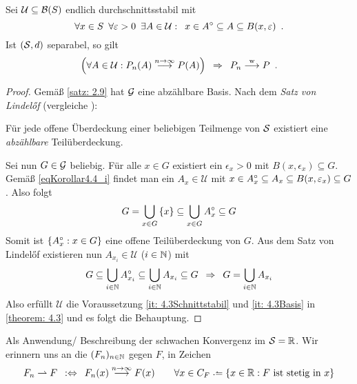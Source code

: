 \begin{korollar} \label{korollar4.4}
	Sei $\mathcal{U} \subseteq \B(S)$ endlich durchschnittsstabil mit
	\begin{equation} \label{eqKorollar4.4_i}
		\forall x\in S \enskip \forall \epsilon > 0 \enskip \exists A \in \mathcal{U} : \enskip x \in \inner A \subseteq A \subseteq B(x,\epsilon)
		\satzende
	\end{equation}
	Ist $(\S,d)$ separabel, so gilt
	\begin{align*}
		\brackets{\forall A \in \mathcal{U}: P_n(A) \ntoinf P(A)}
		\follows P_n \weakto P
		\satzende
	\end{align*}
\end{korollar}

\begin{proof}
	Gemäß \cref{satz: 2.9} hat $\G$ eine abzählbare Basis. Nach dem \textit{Satz von Lindelőf} (vergleiche \cite{schubert423277teubner}):
	\begin{center}
		Für jede offene Überdeckung einer beliebigen Teilmenge von $\S$ existiert eine \emph{abzählbare} Teilüberdeckung.
	\end{center}
	Sei nun $G\in\G$ beliebig.
	Für alle $x\in G$ existiert ein $\epsilon_x>0$ mit $B(x,\epsilon_x)\subseteq G$.
	Gemäß \eqref{eqKorollar4.4_i} findet man ein $A_x\in\mathcal{U}$ mit $x\in \inner{A_x}\subseteq A_x\subseteq B(x,\epsilon_x)\subseteq G$.
	Also folgt
	\begin{align*}
		G=\bigcup_{x\in G}\menge{ x}\subseteq\bigcup_{x\in G}\inner{A_x}\subseteq G
	\end{align*}
	Somit ist $\menge{ \inner{A_x}:x\in G}$ eine offene Teilüberdeckung von $G$.
	Aus dem Satz von Lindelőf existieren nun $A_{x_i}\in\mathcal{U}$ ($i\in\N$) mit
	\begin{align*}
		G\subseteq\bigcup_{i\in\N} \inner{A_{x_i}}\subseteq
		\bigcup_{i\in\N}A_{x_i}\subseteq
		G
		\follows
		G=\bigcup_{i\in\N}A_{x_i}
	\end{align*}
	Also erfüllt $\mathcal{U}$ die Voraussetzung \ref{it: 4.3Schnittstabil} und \ref{it: 4.3Basis} in \cref{theorem: 4.3} und es folgt die Behauptung.
\end{proof}

Als Anwendung/ Beschreibung der schwachen Konvergenz im $\S=\R$.
Wir erinnern uns an die  $(F_n)_{n\in\N}$ gegen $F$, in Zeichen
\begin{equation*}
	F_n \rightharpoonup F
	\defequiv
	F_n(x) \ntoinf  F(x) \qquad\forall x \in C_F \defeq \menge{ x \in \R: F \text{ ist stetig in }x}
\end{equation*}

